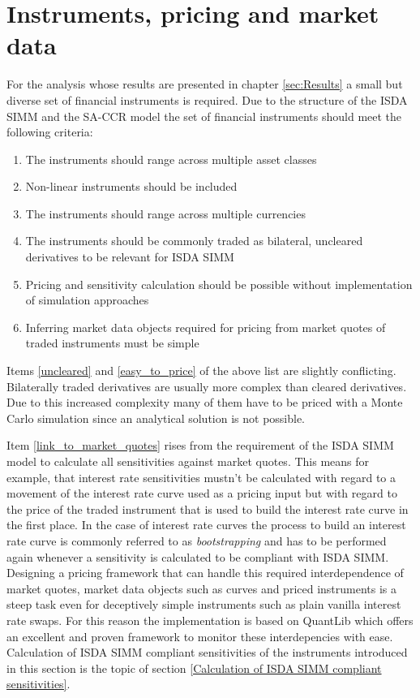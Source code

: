 \documentclass[../Thesis_AHoecherl.tex]{subfiles}
\begin{document}
    \section{Instruments, pricing and market data}\label{Instruments, pricing and market data}
    For the analysis whose results are presented in chapter \ref{sec:Results} a small but diverse set of financial instruments is required. Due to the structure of the \gls{ISDA SIMM} and the \gls{SA-CCR} model the set of financial instruments should meet the following criteria:

    \begin{enumerate}
        \item The instruments should range across multiple asset classes
        \item Non-linear instruments should be included
        \item The instruments should range across multiple currencies
        \item The instruments should be commonly traded as bilateral, uncleared derivatives to be relevant for \gls{ISDA SIMM} \label{uncleared}
        \item Pricing and sensitivity calculation should be possible without implementation of simulation approaches \label{easy_to_price}
        \item Inferring market data objects required for pricing from market quotes of traded instruments must be simple \label{link_to_market_quotes}   
    \end{enumerate}
    
    Items \ref{uncleared} and \ref{easy_to_price} of the above list are slightly conflicting. Bilaterally traded derivatives are usually more complex than cleared derivatives. Due to this increased complexity many of them have to be priced with a Monte Carlo simulation since an analytical solution is not possible.

    Item \ref{link_to_market_quotes} rises from the requirement of the \gls{ISDA SIMM} model to calculate all sensitivities against market quotes. This means for example, that interest rate sensitivities mustn't be calculated with regard to a movement of the interest rate curve used as a pricing input but with regard to the price of the traded instrument that is used to build the interest rate curve in the first place. In the case of interest rate curves the process to build an interest rate curve is commonly referred to as \emph{bootstrapping} and has to be performed again whenever a sensitivity is calculated to be compliant with \gls{ISDA SIMM}. Designing a pricing framework that can handle this required interdependence of market quotes, market data objects such as curves and priced instruments is a steep task even for deceptively simple instruments such as plain vanilla interest rate swaps. For this reason the implementation is based on QuantLib \cite{QuantLib} which offers an excellent and proven framework to monitor these interdepencies with ease. Calculation of \gls{ISDA SIMM} compliant sensitivities of the instruments introduced in this section is the topic of section \ref{Calculation of ISDA SIMM compliant sensitivities}.
\end{document}
